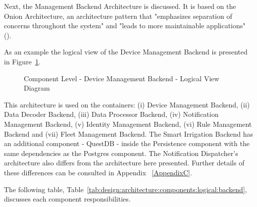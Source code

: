 Next, the Management Backend Architecture is discussed. It is based on the Onion Architecture, an architecture pattern that "emphasizes separation of concerns throughout the system" and "leads to more maintainable applications" (\cite{onion}).

As an example the logical view of the Device Management Backend is presented in Figure~\ref{fig:design:architecture:component:logical:diagram:device}.

\begin{figure}[H]
   \centering
   \resizebox{\columnwidth}{!}
   {
      
   }
   \caption[Component Level - Device Management Backend - Logical View Diagram]{Component Level - Device Management Backend - Logical View Diagram}
   \label{fig:design:architecture:component:logical:diagram:device}
\end{figure}

This architecture is used on the containers: (i) Device Management Backend, (ii) Data Decoder Backend, (iii) Data Processor Backend, (iv) Notification Management Backend, (v) Identity Management Backend, (vi) Rule Management Backend and (vii) Fleet Management Backend. The Smart Irrigation Backend has an additional component - QuestDB - inside the Persistence component with the same dependencies as the Postgres component. The Notification Dispatcher's architecture also differs from the architecture here presented. Further details of these differences can be consulted in Appendix ~\ref{AppendixC}.

The following table, Table~\ref{tab:design:architecture:components:logical:backend}, discusses each component responsibilities.

